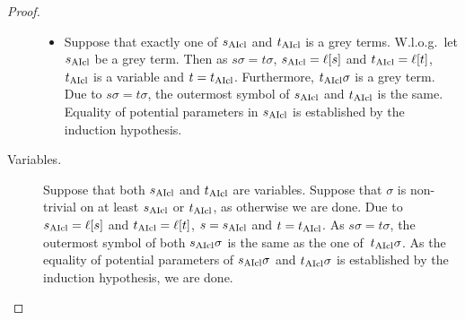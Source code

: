 \documentclass[,%
	paper=a4,%
	DIV14, %
	twoside=false,%
	liststotoc,
	bibtotoc,
	draft=false,%
	numbers=noendperiod
]{scrartcl}
\begin{document}
\begin{proof}
\begin{description}
\begin{itemize}
				\item
					Suppose that exactly one of $s_{\operatorname{AIcl}}$ and $t_{\operatorname{AIcl}}$ is a grey terms. W.l.o.g.~let $s_{\operatorname{AIcl}}$ be a grey term. Then as $s\sigma=t\sigma$, $s_{\operatorname{AIcl}} = \ell[s]$ and $t_{\operatorname{AIcl}} = \ell[t]$, $t_{\operatorname{AIcl}}$ is a variable and $t=t_{\operatorname{AIcl}}$.
					Furthermore, $t_{\operatorname{AIcl}}\sigma$ is a grey term. 
					Due to $s\sigma = t\sigma$, the outermost symbol of $s_{\operatorname{AIcl}}$ and $t_{\operatorname{AIcl}}$ is the same.
					Equality of potential parameters in $s_{\operatorname{AIcl}}$ is established by the induction hypothesis.
			\end{itemize}


		\item[Variables.]
			Suppose that both $s_{\operatorname{AIcl}}$ and $t_{\operatorname{AIcl}}$ are variables. 
			Suppose that $\sigma$ is non-trivial on at least $s_{\operatorname{AIcl}}$ or $t_{\operatorname{AIcl}}$, as otherwise we are done.
			Due to $s_{\operatorname{AIcl}} = \ell[s]$ and $t_{\operatorname{AIcl}} = \ell[t]$, $s = s_{\operatorname{AIcl}}$ and $t=t_{\operatorname{AIcl}}$.
			As $s\sigma=t\sigma$,  the outermost symbol of both $s_{\operatorname{AIcl}}\sigma$ is the same as the one of~$t_{\operatorname{AIcl}}\sigma$. As the equality of potential parameters of $s_{\operatorname{AIcl}}\sigma$ and $t_{\operatorname{AIcl}}\sigma$ is established by the induction hypothesis, we are done.
			\qedhere
	\end{description}
\end{proof}

\newcommand{\clauseOnePrime}{\AIclause(C_1)^*}
\newcommand{\clauseTwoPrime}{\AIclause(C_2)^*}
\end{document}
